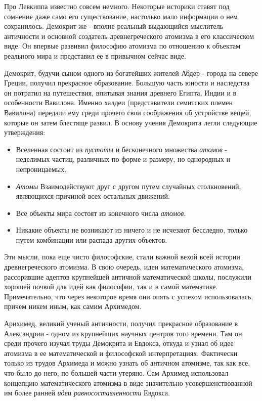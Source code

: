 Про Левкиппа известно совсем немного.
Некоторые историки ставят под сомнение даже само его существование, настолько мало информации о нем сохранилось.
Демокрит же - вполне реальный выдающийся мыслитель античности и основной создатель древнегреческого атомизма в его классическом виде. 
Он впервые развивил философию атомизма по отношению к объектам реального мира и представил ее в привычном сейчас виде.

Демокрит, будучи сыном одного из богатейших жителей Абдер - города на севере Греции, получил прекрасное образование.
Большую часть юности и наследства он потратил на путешествия, впитывая знания древнего Египта, Индии и в особенности Вавилона.
Именно халдеи (представители семитских племен Вавилона) передали ему среди прочего свои соображения об устройстве вещей, которые он затем блестяще развил.
В основу учения Демокрита легли следующие утверждения:
\begin{itemize}
    \item Вселенная состоит из \textit{пустоты} и бесконечного множества \textit{атомов} - неделимых частиц, различных по форме и размеру, но однородных и непроницаемых.
    \item \textit{Атомы} Взаимодействуют друг с другом путем случайных столкновений, являющихся причиной всех остальных движений. 
    \item Все объекты мира состоят из конечного числа \textit{атомов}.
    \item Никакие объекты не возникают из ничего и не исчезают бесследно, только путем комбинации или распада других объектов.
\end{itemize} 
Эти мысли, пока еще чисто философские, стали важной вехой всей истории древнегреческого атомизма.
В свою очередь, идеи математического атомизма, рассорившие адептов крупнейшей античной математической школы, послужили хорошей почвой для идей как философии, так и в самой математике. 
Примечательно, что через некоторое время они опять с успехом использовалась, причем никем иным, как самим Архимедом.

Арихимед, великий ученый античности, получил прекрасное образование в Александрии - одном из крупнейших научных центров того времени. 
Там он среди прочего изучал труды Демокрита и Евдокса, откуда и узнал об идее атомизма в ее математической и философской интерпретациях.
Фактически только из трудов Архимеда и можно узнать об античном атомизме, так как все, что было до него, по большей части утеряно.
Сам Архимед использовал концепцию математического атомизма в виде значительно усовершенствованной им более ранней \textit{идеи равносоставленности} Евдокса.


